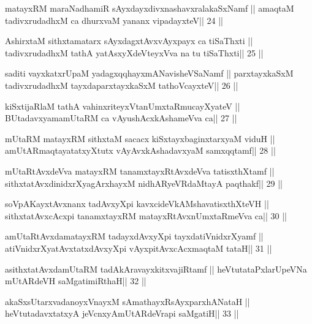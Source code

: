\begin{shl}
matayxRM maraNadhamiR sAyxdayxdivxnashavxralakaSxNamf ||
amaqtaM tadivxrudadhxM ca dhurxvaM yananx vipadayxteV\hfill || 24 ||
\end{shl}

\begin{shl}
AshirxtaM sithxtamatarx sAyxdagxtAvx\s vAyxpayx ca tiSaThxti ||
tadivxrudadhxM tathA yatAsxyXdeVteyxVva na tu tiSaThxti\hfill || 25 ||
\end{shl}

\begin{shl}
saditi vayxkatxrUpaM yadagxqqhayxmANavisheVSaNamf ||
parxtayxkaSxM tadivxrudadhxM tayxdaparxtayxkaSxM tathoVcayxteV\hfill || 26 ||
\end{shl}

\begin{shl}
kiSxtijaRlaM tathA vahinxriteyxVtanUmxtaRmucayXyateV ||
BUtadavxyamamUtaRM ca vAyushAcx\s\s kAshameVva ca\hfill || 27 ||
\end{shl}

\begin{shl}
mUtaRM matayxRM sithxtaM sacacx kiSxtayxbaginxtarxyaM viduH ||
amUtARmaqtayatatxyXtutx vAyAvxkAshadavxyaM samxqqtamf\hfill || 28 ||
\end{shl}

\begin{shl}
mUtaRtAvxdeVva matayxRM tanamxtayxRtAvxdeVva tatisxthXtamf ||
sithxtatAvxdinidxrXyagArxhayxM nidhARyeVRdaMtayA paqthakf\hfill || 29 ||
\end{shl}

\begin{shl}
soVpAKayxtAvxnanx tadAvxyXpi kavxcideVkAMshavatisxthXteVH ||
sithxtatAvxcAcxpi tanamxtayxRM matayxRtAvxnUmxtaRmeVva ca\hfill || 30 ||
\end{shl}

\begin{shl}
amUtaRtAvxdamatayxRM tadayxdAvxyXpi tayxdatiVnidxrXyamf ||
atiVnidxrXyatAvxtatxdAvxyXpi vAyxpitAvxcAcxmaqtaM tataH\hfill || 31 ||
\end{shl}

\begin{shl}
asithxtatAvxdamUtaRM tadAkAravayxkitxvajiRtamf ||
heVtutataPxlarUpeVNa mUtARdeVH saMgatimiRthaH\hfill || 32 ||
\end{shl}

\begin{shl}
akaSxsUtarxvadanoyxVnayxM sAmathayxRsAyxparxhANataH ||
heVtutadavxtatxyA jeVcnxyA\s mUtARdeVrapi saMgatiH\hfill || 33 ||
\end{shl}

